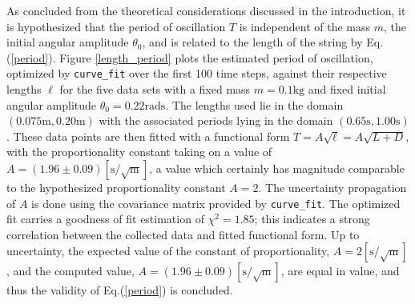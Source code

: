As concluded from the theoretical considerations discussed in the introduction, it 
is hypothesized that the period of oscillation $T$ is independent of the mass $m$, 
the initial angular amplitude $\theta_0$, and is related to the length of the string 
by Eq.(\ref{period}). Figure \ref{length_period} plots the estimated period of oscillation, 
optimized by \texttt{curve\_fit} over the first 100 time steps, against their respective 
lengths $\ell$ for the five data sets with a fixed mass $m = 0.1\text{kg}$ and fixed 
initial angular amplitude $\theta_0 = 0.22\text{rads}$. The lengths used lie in the domain 
$(0.075\text{m}, 0.20\text{m})$ with the associated periods lying in the domain 
$(0.65\text{s}, 1.00\text{s})$. These data points are then fitted with a functional form 
$T = A\sqrt{\ell} = A\sqrt{L + D}$, with the proportionality constant taking on a value of 
$A = (1.96\pm 0.09)[\text{s}/\sqrt{\text{m}}]$, a value which certainly has magnitude 
comparable to the hypothesized proportionality constant $A = 2$. The uncertainty propagation 
of $A$ is done using the covariance matrix provided by \texttt{curve\_fit}. The optimized 
fit carries a goodness of fit estimation of $\chi^2 = 1.85$; this indicates a strong 
correlation between the collected data and fitted functional form. Up to uncertainty, 
the expected value of the constant of proportionality, $A = 2 [\text{s}/\sqrt{\text{m}}]$, 
and the computed value, $A = (1.96 \pm 0.09)[\text{s}/\sqrt{\text{m}}]$, are equal in value, 
and thus the validity of Eq.(\ref{period}) is concluded.


